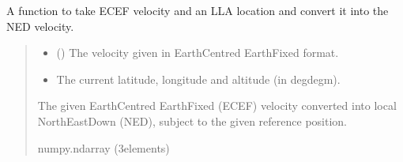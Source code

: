 \documentclass[letterpaper,10pt,english]{sphinxmanual}
\begin{document}

\begin{fulllineitems}
\label{\detokenize{modules/util/transformations:qnav.util.transformations.vel_ecef2vel_ned}}
\pysigstartsignatures
{}
\pysigstopsignatures
\sphinxAtStartPar
A function to take ECEF velocity and an LLA location and convert it into
the NED velocity.
\begin{quote}\begin{description}
\begin{itemize}
\item {} 
\sphinxAtStartPar
{} (\sphinxstyleliteralemphasis{\sphinxupquote{ (}}\sphinxstyleliteralemphasis{\sphinxupquote{)}}) \textendash{} The velocity given in Earth\sphinxhyphen{}Centred Earth\sphinxhyphen{}Fixed format.

\item {} 
\sphinxAtStartPar
{} \textendash{} The current latitude, longitude and altitude (in deg\sphinxhyphen{}deg\sphinxhyphen{}m).

\end{itemize}

\sphinxAtStartPar
The given Earth\sphinxhyphen{}Centred Earth\sphinxhyphen{}Fixed (ECEF) velocity converted
into local North\sphinxhyphen{}East\sphinxhyphen{}Down (NED), subject to the given reference
position.

\sphinxAtStartPar
numpy.ndarray (3\sphinxhyphen{}elements)

\end{description}\end{quote}

\end{fulllineitems}

\end{document}
